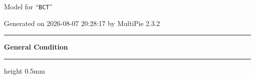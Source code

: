 \documentclass[fleqn,10pt,landscape]{jsarticle}
\begin{document}
\setcounter{MaxMatrixCols}{32}

\renewcommand{\tablename}{Table~}
\renewcommand{\figurename}{Figure~}
\setlength{\baselineskip}{16pt}
\setlength{\parindent}{0pt}
\setlength{\mathindent}{0pt}
\footnotesize
\begin{center}
\LARGE
Model for ``\texttt{BCT}''
\end{center}
\begin{flushright}
Generated on 2026-08-07 20:28:17 by MultiPie 2.3.2
\end{flushright}
\setlength{\baselineskip}{16pt}
\footnotesize
\vspace{5mm}
\noindent \rule[0.5mm]{5mm}{0.5mm}\hspace{3mm}\textbf{General Condition}\hspace{3mm}\leaders\hrule height 0.5mm\hfill\kern0pt
\vspace{3mm}
\end{document}
